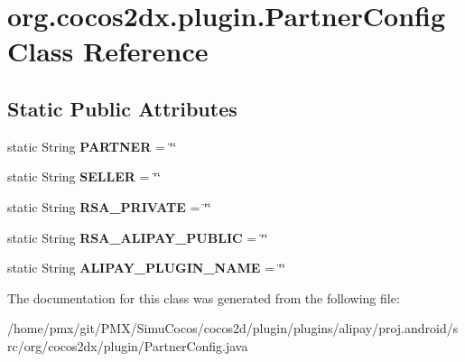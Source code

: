 \hypertarget{classorg_1_1cocos2dx_1_1plugin_1_1PartnerConfig}{}\section{org.\+cocos2dx.\+plugin.\+Partner\+Config Class Reference}
\label{classorg_1_1cocos2dx_1_1plugin_1_1PartnerConfig}
\subsection*{Static Public Attributes}
\begin{DoxyCompactItemize}
\item 
\mbox{\label{classorg_1_1cocos2dx_1_1plugin_1_1PartnerConfig_aefed08dce964ac606100543245f167d0}} 
static String {\bfseries P\+A\+R\+T\+N\+ER} = \char`\"{}\char`\"{}
\item 
\mbox{\label{classorg_1_1cocos2dx_1_1plugin_1_1PartnerConfig_a18c749cef5d5e10470a680fa247df4ef}} 
static String {\bfseries S\+E\+L\+L\+ER} = \char`\"{}\char`\"{}
\item 
\mbox{\label{classorg_1_1cocos2dx_1_1plugin_1_1PartnerConfig_a84b888d385352d179b43c7b4ce3cbbb4}} 
static String {\bfseries R\+S\+A\+\_\+\+P\+R\+I\+V\+A\+TE} = \char`\"{}\char`\"{}
\item 
\mbox{\label{classorg_1_1cocos2dx_1_1plugin_1_1PartnerConfig_a1b10a7512356b7b3046ad91b48a34db7}} 
static String {\bfseries R\+S\+A\+\_\+\+A\+L\+I\+P\+A\+Y\+\_\+\+P\+U\+B\+L\+IC} = \char`\"{}\char`\"{}
\item 
\mbox{\label{classorg_1_1cocos2dx_1_1plugin_1_1PartnerConfig_a40d984e051d465632cec45029f86d953}} 
static String {\bfseries A\+L\+I\+P\+A\+Y\+\_\+\+P\+L\+U\+G\+I\+N\+\_\+\+N\+A\+ME} = \char`\"{}\char`\"{}
\end{DoxyCompactItemize}


The documentation for this class was generated from the following file\+:\begin{DoxyCompactItemize}
\item 
/home/pmx/git/\+P\+M\+X/\+Simu\+Cocos/cocos2d/plugin/plugins/alipay/proj.\+android/src/org/cocos2dx/plugin/Partner\+Config.\+java\end{DoxyCompactItemize}
